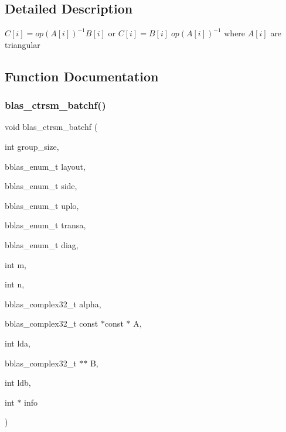 \subsection{Detailed Description}
$ C[i] = op(A[i])^{-1} B[i] $ or $ C[i] = B[i] \;op(A[i])^{-1} $ where $ A[i] $ are triangular 



\subsection{Function Documentation}
\mbox{\label{group__trsm__batchf_ga8d26eef5fac78c6c866b81bfd73ec443}} 
\subsubsection{\texorpdfstring{blas\+\_\+ctrsm\+\_\+batchf()}{blas\_ctrsm\_batchf()}}
{\footnotesize\ttfamily void blas\+\_\+ctrsm\+\_\+batchf (\begin{DoxyParamCaption}\item[{int}]{group\+\_\+size,  }\item[{bblas\+\_\+enum\+\_\+t}]{layout,  }\item[{bblas\+\_\+enum\+\_\+t}]{side,  }\item[{bblas\+\_\+enum\+\_\+t}]{uplo,  }\item[{bblas\+\_\+enum\+\_\+t}]{transa,  }\item[{bblas\+\_\+enum\+\_\+t}]{diag,  }\item[{int}]{m,  }\item[{int}]{n,  }\item[{bblas\+\_\+complex32\+\_\+t}]{alpha,  }\item[{bblas\+\_\+complex32\+\_\+t const $\ast$const $\ast$}]{A,  }\item[{int}]{lda,  }\item[{bblas\+\_\+complex32\+\_\+t $\ast$$\ast$}]{B,  }\item[{int}]{ldb,  }\item[{int $\ast$}]{info }\end{DoxyParamCaption})}

